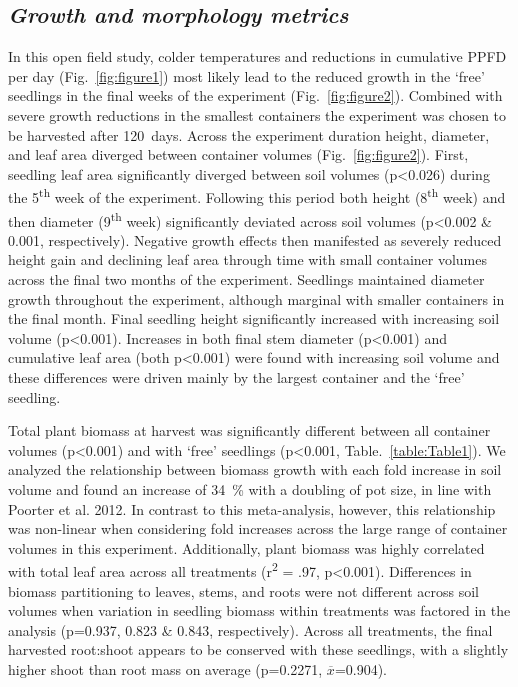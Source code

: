 \documentclass[a4paper]{article}\usepackage[]{graphicx}\usepackage[]{color}
\begin{document}
\subsection*{\textit{Growth and morphology metrics}}
In this open field study, colder temperatures and reductions in cumulative PPFD per day (Fig.~\ref{fig:figure1}) most likely lead to the reduced growth in the ‘free’ seedlings in the final weeks of the experiment (Fig.~\ref{fig:figure2}).  Combined with severe growth reductions in the smallest containers the experiment was chosen to be harvested after 120~days. Across the experiment duration height, diameter, and leaf area diverged between container volumes (Fig.~\ref{fig:figure2}).  First, seedling leaf area significantly diverged between soil volumes (p\textless0.026) during the 5\textsuperscript{th} week of the experiment. Following this period both height (8\textsuperscript{th} week) and then diameter (9\textsuperscript{th} week) significantly deviated across soil volumes (p\textless0.002 \& 0.001, respectively).  Negative growth effects then manifested as severely reduced height gain and declining leaf area through time with small container volumes across the final two months of the experiment. Seedlings maintained diameter growth throughout the experiment, although marginal with smaller containers in the final month. Final seedling height significantly increased with increasing soil volume (p\textless0.001).  Increases in both final stem diameter (p\textless0.001) and cumulative leaf area (both p\textless0.001) were found with increasing soil volume and these differences were driven mainly by the largest container and the ‘free’ seedling.

Total plant biomass at harvest was significantly different between all container volumes (p\textless0.001) and with ‘free’ seedlings (p\textless0.001, Table.~\ref{table:Table1}). We analyzed the relationship between biomass growth with each fold increase in soil volume and found an increase of 34~\% with a doubling of pot size, in line with Poorter et al. 2012. In contrast to this meta-analysis, however, this relationship was non-linear when considering fold increases across the large range of container volumes in this experiment.   Additionally, plant biomass was highly correlated with total leaf area across all treatments (r\textsuperscript{2} = .97, p\textless0.001). Differences in biomass partitioning to leaves, stems, and roots were not different across soil volumes when variation in seedling biomass within treatments was factored in the analysis (p=0.937, 0.823 \& 0.843, respectively). Across all treatments, the final harvested root:shoot appears to be conserved with these seedlings, with a slightly higher shoot than root mass on average (p=0.2271, $\overline{x}$=0.904).
\end{document}
